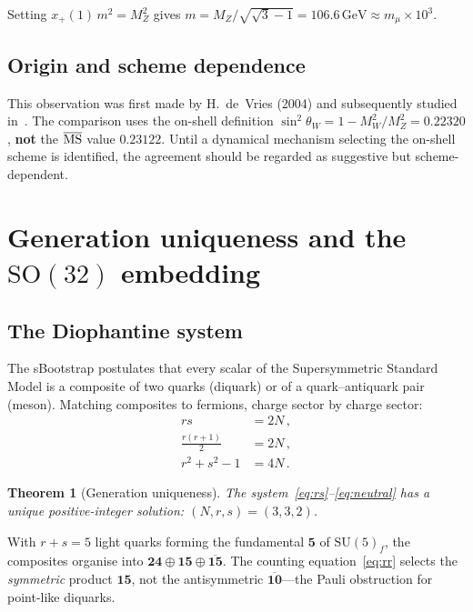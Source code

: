 \documentclass[12pt,a4paper]{article}
\newtheorem{theorem}{Theorem}
\newcommand{\SU}{\mathrm{SU}}
\newcommand{\SO}{\mathrm{SO}}
\newcommand{\GeV}{\,\mathrm{GeV}}
\begin{document}
Setting $x_+(1)\,m^2 = M_Z^2$ gives
$m = M_Z/\sqrt{\sqrt{3} - 1} = 106.6\GeV \approx m_\mu \times 10^3$.

\subsection{Origin and scheme dependence}

This observation was first made by H.~de~Vries (2004) and
subsequently studied in~\cite{Rivero:2005b}.
The comparison uses the on-shell definition
$\sin^2\theta_W = 1 - M_W^2/M_Z^2 = 0.22320$,
\textbf{not} the $\overline{\rm MS}$ value $0.23122$.
Until a dynamical mechanism selecting the on-shell scheme is
identified, the agreement should be regarded as suggestive but
scheme-dependent.


\section{Generation uniqueness and the $\SO(32)$ embedding}
\label{sec:SO32}

\subsection{The Diophantine system}

The sBootstrap postulates that every scalar of the
Supersymmetric Standard Model is a composite of two quarks
(diquark) or of a quark--antiquark pair (meson).
Matching composites to fermions, charge sector by charge sector:
\begin{align}
  rs &= 2N\,, \label{eq:rs}\\
  \frac{r(r{+}1)}{2} &= 2N\,, \label{eq:rr}\\
  r^2 + s^2 - 1 &= 4N\,. \label{eq:neutral}
\end{align}

\begin{theorem}[Generation uniqueness]
The system~\eqref{eq:rs}--\eqref{eq:neutral} has a unique
positive-integer solution:
$(N, r, s) = (3, 3, 2)$.
\end{theorem}

\noindent With $r + s = 5$ light quarks forming the fundamental
$\mathbf{5}$ of $\SU(5)_f$, the composites organise into
$\mathbf{24} \oplus \mathbf{15} \oplus \overline{\mathbf{15}}$.
The counting equation~\eqref{eq:rr} selects the
\emph{symmetric} product $\mathbf{15}$, not the antisymmetric
$\overline{\mathbf{10}}$---the Pauli obstruction for
point-like diquarks.
\end{document}
